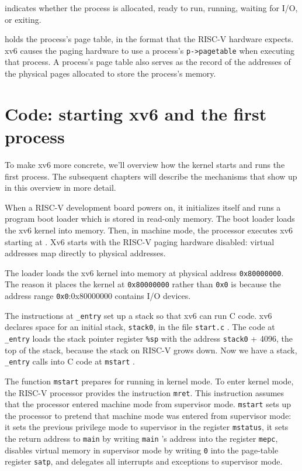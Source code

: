 indicates whether the process is allocated, ready
to run, running, waiting for I/O, or exiting.

holds the process's page table, in the format
that the RISC-V hardware expects.
xv6 causes the paging hardware to use a process's
\lstinline{p->pagetable}
when executing that process.
A process's page table also serves as the record of the
addresses of the physical pages allocated to store the process's memory.
\section{Code: starting xv6 and the first process}
To make xv6 more concrete, we'll overview how the kernel starts and
runs the first process. The subsequent chapters will describe the
mechanisms that show up in this overview in more detail.

When a RISC-V development board powers on, it initializes
itself and runs a program boot loader which is stored in read-only
memory.  The boot loader loads the xv6 kernel into memory.  Then, in
machine mode, the processor executes xv6 starting at
.
Xv6 starts with the RISC-V paging hardware disabled:
virtual addresses map directly to physical addresses.

The loader loads the xv6 kernel into memory at physical address
\texttt{0x80000000}.
The reason it places the kernel at
\texttt{0x80000000}
rather than
\texttt{0x0}
is because the address range
\texttt{0x0}:0x80000000
contains I/O devices.

The instructions at
\lstinline{_entry}
set up a stack so that xv6 can run C code.
xv6 declares space for an initial stack,
\lstinline{stack0},
in the file
\lstinline{start.c}
.
The code at
\lstinline{_entry}
loads the stack pointer register
\texttt{\%sp}
with the address
\lstinline{stack0}
+ 4096, the top of the stack, because the stack
on RISC-V grows down.
Now we have a stack,
\lstinline{_entry}
calls into C code at
\lstinline{mstart}
.

The function
\lstinline{mstart}
prepares for running in kernel mode.
To enter kernel mode, the RISC-V processor
provides the instruction
\lstinline{mret}.
This instruction assumes that the processor
entered machine mode from supervisor mode.
\lstinline{mstart}
sets up the processor to pretend
that machine mode was entered
from supervisor mode:
it sets the previous privilege mode to
supervisor in the register
\lstinline{mstatus},
it sets the return address to
\lstinline{main}
by writing
\lstinline{main} 's
address into
the register
\lstinline{mepc},
disables virtual memory in supervisor mode
by writing
\lstinline{0}
into the page-table register
\lstinline{satp},
and delegates all interrupts and exceptions
to supervisor mode.

